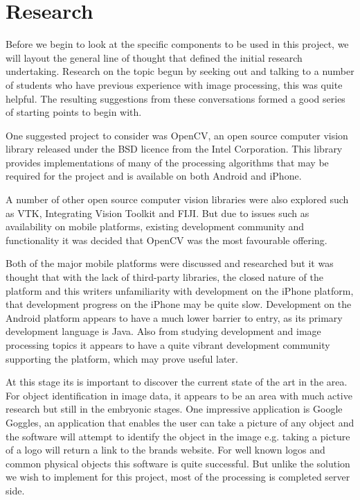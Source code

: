 \chapter{Research}

Before we begin to look at the specific components to be used in this project, we will layout the general line of thought that defined the initial research undertaking. Research on the topic begun by seeking out and talking to a number of students who have previous experience with image processing, this was quite helpful. The resulting suggestions from these conversations formed a good series of starting points to begin with.

One suggested project to consider was OpenCV, an open source computer vision library released under the BSD licence from the Intel Corporation\textsuperscript{\texttrademark}. This library provides implementations of many of the processing algorithms that may be required for the project and is available on both Android and iPhone.

A number of other open source computer vision libraries were also explored such as VTK, Integrating Vision Toolkit and FIJI. But due to issues such as availability on mobile platforms, existing development community and functionality it was decided that OpenCV was the most favourable offering.

Both of the major mobile platforms were discussed and researched but it was thought that with the lack of third-party libraries, the closed nature of the platform and this writers unfamiliarity with development on the iPhone platform, that development progress on the iPhone may be quite slow. Development on the Android platform appears to have a much lower barrier to entry, as its primary development language is Java. Also from studying development and image processing topics it appears to have a quite vibrant development community supporting the platform, which may prove useful later.

At this stage its is important to discover the current state of the art in the area. For object identification in image data, it appears to be an area with much active research but still in the embryonic stages. One impressive application is Google Goggles\textsuperscript{\texttrademark}, an application that enables the user can take a picture of any object and the software will attempt to identify the object in the image e.g. taking a picture of a logo will return a link to the brands website. For well known logos and common physical objects this software is quite successful. But unlike the solution we wish to implement for this project, most of the processing is completed server side.

